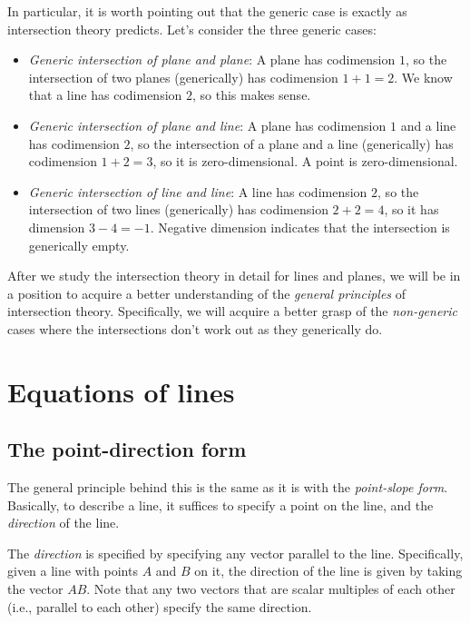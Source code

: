 \documentclass[10pt]{amsart}
\begin{document}
In particular, it is worth pointing out that the generic case is
exactly as intersection theory predicts. Let's consider the three
generic cases:

\begin{itemize}
\item {\em Generic intersection of plane and plane}: A plane has
  codimension $1$, so the intersection of two planes (generically) has
  codimension $1 + 1 = 2$. We know that a line has codimension $2$, so
  this makes sense.
\item {\em Generic intersection of plane and line}: A plane has
  codimension $1$ and a line has codimension $2$, so the intersection
  of a plane and a line (generically) has codimension $1 + 2 = 3$, so
  it is zero-dimensional. A point is zero-dimensional.
\item {\em Generic intersection of line and line}: A line has
  codimension $2$, so the intersection of two lines (generically) has
  codimension $2 + 2 = 4$, so it has dimension $3 - 4 = -1$. Negative
  dimension indicates that the intersection is generically empty.
\end{itemize}

After we study the intersection theory in detail for lines and planes,
we will be in a position to acquire a better understanding of the {\em
general principles} of intersection theory. Specifically, we will
acquire a better grasp of the {\em non-generic} cases where the
intersections don't work out as they generically do.

\section{Equations of lines}

\subsection{The point-direction form}

The general principle behind this is the same as it is with the {\em
point-slope form}. Basically, to describe a line, it suffices to
specify a point on the line, and the {\em direction} of the line.

The {\em direction} is specified by specifying any vector parallel to
the line. Specifically, given a line with points $A$ and $B$ on it,
the direction of the line is given by taking the vector $AB$. Note
that any two vectors that are scalar multiples of each other (i.e.,
parallel to each other) specify the same direction.
\end{document}
